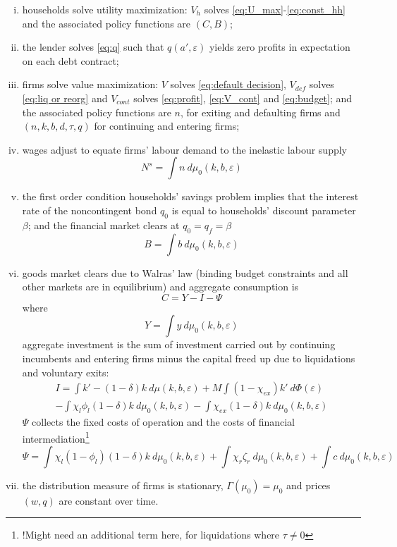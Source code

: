 \documentclass[12pt]{article}
\begin{document}
\begin{enumerate}[(i)]
\item households solve utility maximization: $V_h$ solves \ref{eq:U_max}-\ref{eq:const_hh} and the associated policy functions are $(C, B)$;
\item the lender solves \ref{eq:q} such that $q(a',\varepsilon)$ yields zero profits in expectation on each debt contract;
\item firms solve value maximization: $V$ solves \ref{eq:default decision}, $V_{def}$ solves \ref{eq:liq or reorg} and $V_{cont}$ solves \ref{eq:profit}, \ref{eq:V_cont} and \ref{eq:budget}; and the associated policy functions are $n$, for exiting and defaulting firms and $(n,k,b,d,\tau,q)$ for continuing and entering firms;
\item wages adjust to equate firms' labour demand to the inelastic labour supply
$$ N^s = \int n  \ d \mu_0 (k,b,\varepsilon)  $$
\item the first order condition households' savings problem implies that the interest rate of the noncontingent bond $q_0$ is equal to households' discount parameter $\beta$; and the financial market clears at $q_0 = q_f = \beta$
 $$ B = \int b \ d \mu_0 (k,b,\varepsilon) $$
\item goods market clears due to Walras' law (binding budget constraints and all other markets are in equilibrium) and aggregate consumption is
 $$ C = Y - I - \Psi$$
where
 $$ Y =  \int y \ d \mu_0 (k,b,\varepsilon) $$
aggregate investment is the sum of investment carried out by continuing incumbents and entering firms minus the capital freed up due to liquidations and voluntary exits:
\begin{multline*} 
    I = \int   k' -(1-\delta)k \ d \mu (k,b,\varepsilon) + M \int (1-\chi_{ex}) k' \ d \Phi(\varepsilon)    \\
   -  \int   \chi_l \phi_l (1-\delta)k \ d \mu_0 (k,b,\varepsilon) - \int \chi_{ex} (1-\delta) k \ d \mu_0 (k,b,\varepsilon)   
\end{multline*}
$\Psi$ collects the fixed costs of operation and the costs of financial intermediation\footnote{!Might need an additional term here, for liquidations where $\tau \neq 0$}
$$ \Psi = \int  \chi_l (1-\phi_l) (1-\delta)k \ d \mu_0 (k,b,\varepsilon) + \int  \chi_r \zeta_r \ d \mu_0 (k,b,\varepsilon) + \int  c \ d \mu_0 (k,b,\varepsilon) $$
\item the distribution measure of firms is stationary, $\Gamma(\mu_0) = \mu_0$ and prices $(w,q)$ are constant over time.
\end{enumerate}
\end{document}
